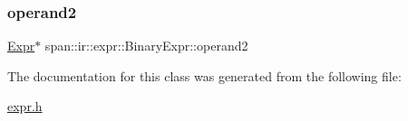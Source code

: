 \mbox{\label{classspan_1_1ir_1_1expr_1_1BinaryExpr_a60b088f3fcd2aabbc10445b4c693cfcf}} 
\subsubsection{\texorpdfstring{operand2}{operand2}}
{\footnotesize\ttfamily \hyperlink{classspan_1_1ir_1_1expr_1_1Expr}{Expr}$\ast$ span\+::ir\+::expr\+::\+Binary\+Expr\+::operand2\hspace{0.3cm}{\ttfamily [private]}}



The documentation for this class was generated from the following file\+:\begin{DoxyCompactItemize}
\item 
\hyperlink{expr_8h}{expr.\+h}\end{DoxyCompactItemize}
